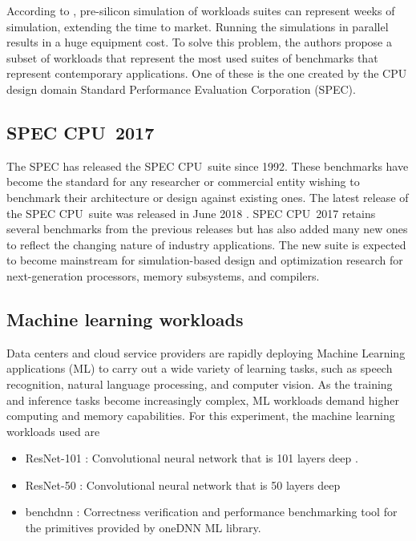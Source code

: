 \documentclass[]{PhDEngScITESO-R}
\begin{document}
According to \cite{Eeckhout}, pre-silicon simulation of workloads suites can represent  weeks of simulation, extending the time to market. Running the simulations in parallel results in a huge equipment cost. To solve this problem, the authors propose a subset of workloads that represent the most used suites of benchmarks that represent contemporary applications. One of these is the one created by the CPU design domain Standard Performance Evaluation Corporation (SPEC).

\subsection{SPEC CPU\textregistered\   2017}

The SPEC has released the SPEC CPU\textregistered\  suite since 1992. These benchmarks have become the standard for any researcher or commercial entity wishing to benchmark their architecture or design against existing ones. The latest release of the SPEC CPU\textregistered\ suite was released in June 2018 \cite{Singh}. SPEC CPU\textregistered\  2017 retains several benchmarks from the previous releases but has also added many new ones to reflect the changing nature of industry applications. The new suite is expected to become mainstream for simulation-based design and optimization research for next-generation processors, memory subsystems, and compilers.

\subsection{Machine learning workloads}

Data centers and cloud service providers are rapidly deploying Machine Learning applications (ML) to carry out a wide variety of learning tasks, such as speech recognition, natural language processing, and computer vision. As the training and inference tasks become increasingly complex, ML  workloads  demand  higher  computing  and  memory  capabilities.  For this experiment, the machine learning workloads used are

\begin{itemize}
\item ResNet-101 : Convolutional neural network that is 101 layers deep \cite{Zhang}.  
\item ResNet-50 : Convolutional neural network that is 50 layers deep
\item benchdnn : Correctness verification and performance benchmarking tool for the primitives provided by oneDNN ML library. \cite{Goli}
\end{itemize}
\end{document}
